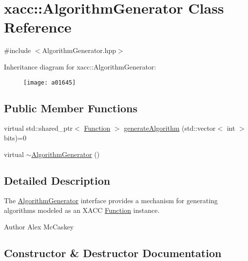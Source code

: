 \hypertarget{a01645}{}\section{xacc\+:\+:Algorithm\+Generator Class Reference}
\label{a01645}


{\ttfamily \#include $<$Algorithm\+Generator.\+hpp$>$}

Inheritance diagram for xacc\+:\+:Algorithm\+Generator\+:\begin{figure}[H]
\begin{center}
\leavevmode
\texttt{[image: a01645]}
\end{center}
\end{figure}
\subsection*{Public Member Functions}
\begin{DoxyCompactItemize}
\item 
virtual std\+::shared\+\_\+ptr$<$ \hyperlink{a01653}{Function} $>$ \hyperlink{a01645_a73023c06f0f0c62ad56ab4187b18b096}{generate\+Algorithm} (std\+::vector$<$ int $>$ bits)=0
\item 
virtual \hyperlink{a01645_a096f66aa8d65f5aa3276915768159579}{$\sim$\+Algorithm\+Generator} ()
\end{DoxyCompactItemize}


\subsection{Detailed Description}
The \hyperlink{a01645}{Algorithm\+Generator} interface provides a mechanism for generating algorithms modeled as an X\+A\+CC \hyperlink{a01653}{Function} instance.

\begin{DoxyAuthor}{Author}
Alex Mc\+Caskey 
\end{DoxyAuthor}


\subsection{Constructor \& Destructor Documentation}
\mbox{\label{a01645_a096f66aa8d65f5aa3276915768159579}} 
